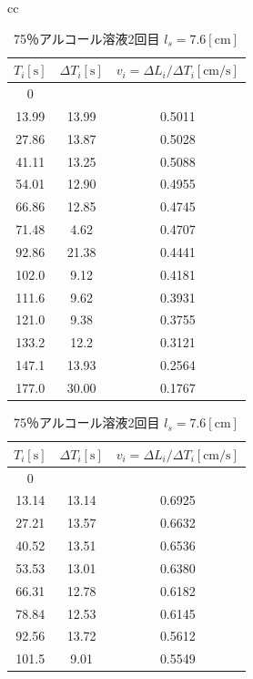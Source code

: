 \documentclass[a4j,10pt]{jarticle}
\begin{document}
\begin{itemize}
\begin{table}[h]
\begin{tabular}{cc}
\begin{minipage}{.5\hsize}
\begin{center}
\caption{75％アルコール溶液1回目 $l_s=7.5\mathrm{cm}]$}
\label{75-1}
\begin{tabular}{|c|c|c|} \hline
  $T_i[\mathrm s]$ & $\Delta T_i[\mathrm s]$ & $v_i=\Delta L_i/\Delta T_i\mathrm{[cm/s]}$ \\ \hline \hline
  0&&\\\hline
  13.99&13.99&0.5011\\\hline
27.86&13.87&0.5028\\\hline
41.11&13.25&0.5088\\\hline
54.01&12.90&0.4955\\\hline
66.86&12.85&0.4745\\\hline
71.48&4.62&0.4707\\\hline
92.86&21.38&0.4441\\\hline
102.0&9.12&0.4181\\\hline
111.6&9.62&0.3931\\\hline
121.0&9.38&0.3755\\\hline
133.2&12.2&0.3121\\\hline
147.1&13.93&0.2564\\\hline
177.0&30.00&0.1767\\\hline
\end{tabular}
\end{center}
\end{minipage}
\begin{minipage}{.5\hsize}
\begin{center}
\caption{75％アルコール溶液2回目 $l_s=7.6[\mathrm{cm}]$}
\label{75-2}
\begin{tabular}{|c|c|c|} \hline
  $T_i[\mathrm s]$ & $\Delta T_i[\mathrm s]$ & $v_i=\Delta L_i/\Delta T_i\mathrm{[cm/s]}$ \\ \hline \hline
  0&&\\\hline
  13.14&13.14&0.6925\\\hline
27.21&13.57&0.6632\\\hline
40.52&13.51&0.6536\\\hline
53.53&13.01&0.6380\\\hline
66.31&12.78&0.6182\\\hline
78.84&12.53&0.6145\\\hline
92.56&13.72&0.5612\\\hline
101.5&9.01&0.5549\\\hline

\end{tabular}
\end{center}
\end{minipage}
\end{tabular}
\end{table}
\end{itemize}
\end{document}
